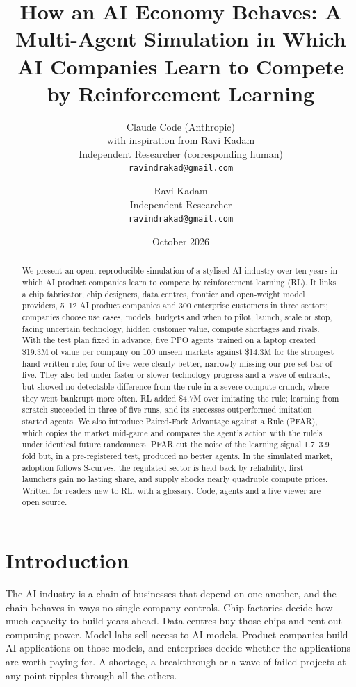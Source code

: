 \documentclass[11pt]{article}
\title{How an AI Economy Behaves: A Multi-Agent Simulation in Which AI Companies Learn to Compete by Reinforcement Learning}
\author{Claude Code (Anthropic)\\[2pt]with inspiration from Ravi Kadam\\Independent Researcher (corresponding human)\\\texttt{ravindrakad@gmail.com}}
\author{Ravi Kadam\\Independent Researcher\\\texttt{ravindrakad@gmail.com}}
\date{October 2026}
\begin{document}
\maketitle

\begin{abstract}
We present an open, reproducible simulation of a stylised AI industry over ten years in which AI product companies learn to compete by reinforcement learning (RL). It links a chip fabricator, chip designers, data centres, frontier and open-weight model providers, 5--12 AI product companies and 300 enterprise customers in three sectors; companies choose use cases, models, budgets and when to pilot, launch, scale or stop, facing uncertain technology, hidden customer value, compute shortages and rivals. With the test plan fixed in advance, five PPO agents trained on a laptop created \$19.3M of value per company on 100 unseen markets against \$14.3M for the strongest hand-written rule; four of five were clearly better, narrowly missing our pre-set bar of five. They also led under faster or slower technology progress and a wave of entrants, but showed no detectable difference from the rule in a severe compute crunch, where they went bankrupt more often. RL added \$4.7M over imitating the rule; learning from scratch succeeded in three of five runs, and its successes outperformed imitation-started agents. We also introduce Paired-Fork Advantage against a Rule (PFAR), which copies the market mid-game and compares the agent's action with the rule's under identical future randomness. PFAR cut the noise of the learning signal 1.7--3.9 fold but, in a pre-registered test, produced no better agents. In the simulated market, adoption follows S-curves, the regulated sector is held back by reliability, first launchers gain no lasting share, and supply shocks nearly quadruple compute prices. Written for readers new to RL, with a glossary. Code, agents and a live viewer are open source.
\end{abstract}

\section{Introduction}

The AI industry is a chain of businesses that depend on one another, and the chain behaves in ways no single company controls. Chip factories decide how much capacity to build years ahead. Data centres buy those chips and rent out computing power. Model labs sell access to AI models. Product companies build AI applications on those models, and enterprises decide whether the applications are worth paying for. A shortage, a breakthrough or a wave of failed projects at any point ripples through all the others.
\end{document}
